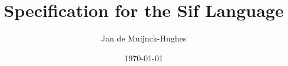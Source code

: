\title{Specification for the Sif Language}

\author{Jan de Muijnck-Hughes\\[0.2em]
}

\date{\today}
